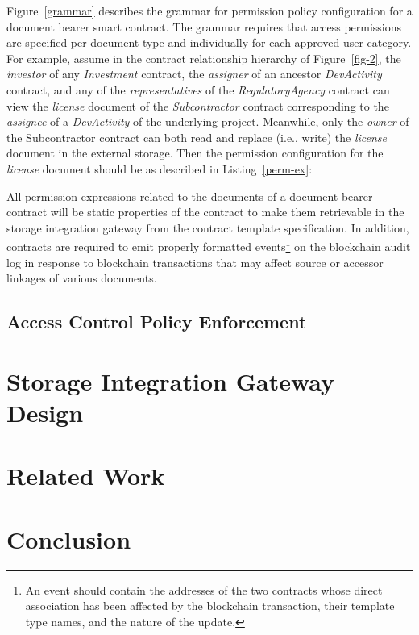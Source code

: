 \documentclass[conference]{IEEEtran}
\begin{document}
Figure~\ref{grammar} describes the grammar for permission policy configuration for a document bearer smart contract. The grammar requires that access permissions are specified per document type and individually for each approved user category. For example, assume in the contract relationship hierarchy of Figure~\ref{fig-2}, the {\it investor} of any {\it Investment} contract, the {\it assigner} of an ancestor {\it DevActivity} contract, and any of the {\it representatives} of the {\it RegulatoryAgency} contract can view the {\it license} document of the {\it Subcontractor} contract corresponding to the {\it assignee} of a {\it DevActivity} of the underlying project. Meanwhile, only the {\it owner} of the {Subcontractor} contract can both read and replace (i.e., write) the {\it license} document in the external storage. Then the permission configuration for the {\it license} document should be as described in Listing~\ref{perm-ex}:

\lstset{caption=Example access permission configuration, label=perm-ex}


All permission expressions related to the documents of a document bearer contract will be static properties of the contract to make them retrievable in the storage integration gateway from the contract template specification. In addition, contracts are required to emit properly formatted events\footnote{An event should contain the addresses of the two contracts whose direct association has been affected by the blockchain transaction, their template type names, and the nature of the update.} on the blockchain audit log in response to blockchain transactions that may affect source or accessor linkages of various documents.

\subsection{Access Control Policy Enforcement}       

\section{Storage Integration Gateway Design}
\label{s-gate}

\section{Related Work}
\label{s-rw}

\section{Conclusion}
\label{s-con}
 


\end{document}
